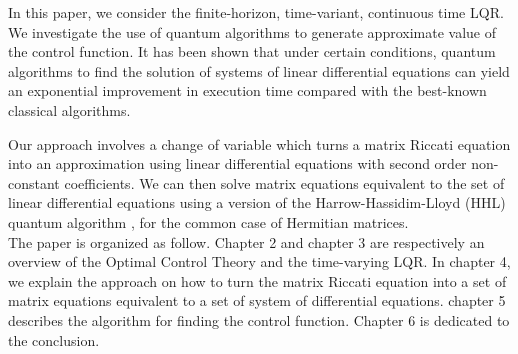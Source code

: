 \documentclass[12pt]{article}
\begin{document}
In this paper, we consider the finite-horizon, time-variant, continuous time LQR. We investigate the use of quantum algorithms to generate approximate value of the control function.
 It has been shown  \cite{Harrow} that under certain conditions, quantum algorithms to find the solution of systems of linear differential equations can yield
an exponential improvement in execution time compared with the best-known classical algorithms.

Our approach
involves a change of variable  which turns a matrix Riccati  equation into an approximation using linear differential equations with
second order non-constant coefficients. We can then solve  matrix equations equivalent to the set of linear
differential equations using a version of the Harrow-Hassidim-Lloyd (HHL) quantum algorithm \cite{Harrow}, for
the common case of Hermitian matrices.\\
The paper is organized as follow.
 Chapter 2 and chapter 3 are respectively an overview of the Optimal
Control Theory and the time-varying LQR.
In chapter 4, we explain  the approach  on how to 
turn the matrix Riccati equation into a set of matrix equations equivalent to a set of system of differential equations.  
 chapter 5 describes  the algorithm  for finding the control function.
Chapter 6 is dedicated to the conclusion.
  
\end{document}
